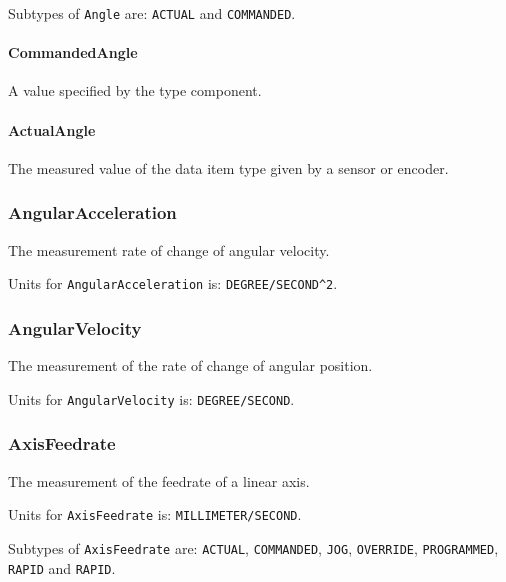 Subtypes of \texttt{Angle} are: \texttt{ACTUAL} and \texttt{COMMANDED}. 
\FloatBarrier

\paragraph{CommandedAngle}\mbox{}
\label{sec:CommandedAngle}



A value specified by the  type component.


\paragraph{ActualAngle}\mbox{}
\label{sec:ActualAngle}



The measured value of the data item type given by a sensor or encoder.


\subsubsection{AngularAcceleration}
\label{sec:AngularAcceleration}



The measurement rate of change of angular velocity.


Units for \texttt{AngularAcceleration} is: \texttt{DEGREE/SECOND\^{}2}.

\FloatBarrier

\subsubsection{AngularVelocity}
\label{sec:AngularVelocity}



The measurement of the rate of change of angular position.


Units for \texttt{AngularVelocity} is: \texttt{DEGREE/SECOND}.

\FloatBarrier

\subsubsection{AxisFeedrate}
\label{sec:AxisFeedrate}



The measurement of the feedrate of a linear axis.


Units for \texttt{AxisFeedrate} is: \texttt{MILLIMETER/SECOND}.


Subtypes of \texttt{AxisFeedrate} are: \texttt{ACTUAL}, \texttt{COMMANDED}, \texttt{JOG}, \texttt{OVERRIDE}, \texttt{PROGRAMMED}, \texttt{RAPID} and \texttt{RAPID}. 
\FloatBarrier

